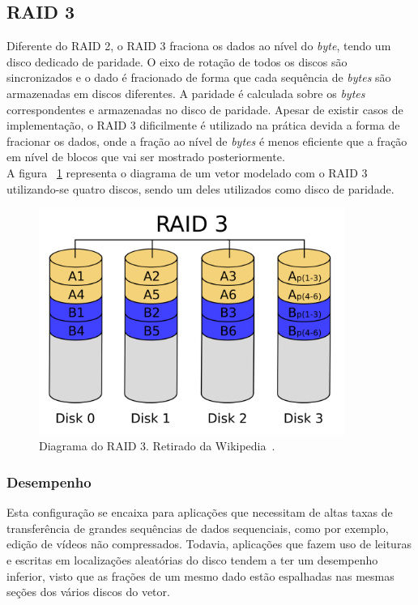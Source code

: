 	
		\subsection{RAID 3}
		
		Diferente do RAID 2, o RAID 3 fraciona os dados ao nível do \textit{byte}, tendo um disco dedicado de paridade. O eixo de rotação de todos os discos são sincronizados e o dado é fracionado de forma que cada sequência de \textit{bytes} são armazenadas em discos diferentes. A paridade é calculada sobre os \textit{bytes} correspondentes e armazenadas no disco de paridade. Apesar de existir casos de implementação, o RAID 3 dificilmente é utilizado na prática devida a forma de 
		fracionar os dados, onde a fração ao nível de \textit{bytes} é menos eficiente que a fração em nível de blocos que vai ser mostrado posteriormente.\\
		
		A figura ~\ref{fig:raid3} representa o diagrama de um vetor modelado com o RAID 3 utilizando-se quatro discos, sendo um deles utilizados como disco de paridade.\\
		
		\begin{figure}[htb]
			\begin{center}
				
				\includegraphics[clip,width=10.0cm]{images/RAID_3.png}
				\caption{Diagrama do RAID 3. Retirado da Wikipedia~\citep{wikiRAIDlevels}.}
				\label{fig:raid3}
			\end{center}
		\end{figure} 
		
		\subsubsection{Desempenho}
		Esta configuração se encaixa para aplicações que necessitam de altas taxas de transferência de grandes sequências de dados sequenciais, como por exemplo, edição de vídeos não compressados. Todavia, aplicações que fazem uso de leituras e escritas em localizações aleatórias do disco tendem a ter um desempenho inferior, visto que as frações de um mesmo dado estão espalhadas nas mesmas seções dos vários discos do vetor.\\
		
